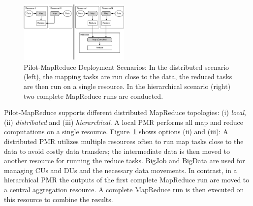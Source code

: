 \documentclass{acm_proc_article-sp}
\newcommand{\jhanote}[1]{ {\textcolor{red} { ***shantenu: #1 }}}
\newcommand{\alnote}[1]{ {\textcolor{blue} { ***andreL: #1 }}}
\newcommand{\alnote}[1]{}
\newcommand{\jhanote}[1]{}
\newcommand{\pilotmapreduce}{Pilot-MapReduce\xspace}
\begin{document}
\begin{figure}
	\centering
	\includegraphics[width=0.48\textwidth]{figures/distributed_hierachical.pdf}
	\caption{\pilotmapreduce Deployment Scenarios: In the
          distributed scenario (left), the mapping tasks are run close
          to the data, the reduced tasks are then run on a single
          resource. In the hierarchical scenario (right) two complete
          MapReduce runs are
          conducted. \label{fid:distributed-mapreduce-overview}}
\end{figure}


\pilotmapreduce supports different distributed MapReduce topologies:
(i) \emph{local}, (ii) \emph{distributed} and (iii)
\emph{hierarchical}. A local PMR performs all map and reduce
computations on a single resource.
Figure~\ref{fid:distributed-mapreduce-overview} shows options (ii) and
(iii): A distributed PMR utilizes multiple resources often to run map
tasks close to the data to avoid costly data transfers; the
intermediate data is then moved to another resource for running the
reduce tasks. BigJob and BigData are used for managing CUs and DUs and
the necessary data movements. In contrast, in a hierarchical PMR the
outputs of the first complete MapReduce run are moved to a central
aggregation resource. A complete MapReduce run is then executed on
this resource to combine the results. %
\end{document}
